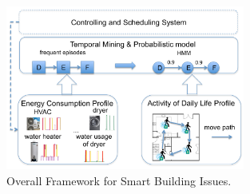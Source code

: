 \begin{figure}[!hbtp]
\centering
\includegraphics[width=0.7\textwidth]{fig/framework.pdf}
\caption{Overall Framework for Smart Building Issues.\label{fig_framework_whole}}
\end{figure}
